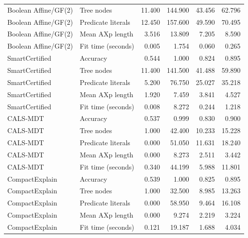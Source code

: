 \begin{longtable}{llrrrr}
Boolean Affine/GF(2) & Tree nodes & 11.400 & 144.900 & 43.456 & 62.796 \\
Boolean Affine/GF(2) & Predicate literals & 12.450 & 157.600 & 49.590 & 70.495 \\
Boolean Affine/GF(2) & Mean AXp length & 3.516 & 13.809 & 7.205 & 8.590 \\
Boolean Affine/GF(2) & Fit time (seconds) & 0.005 & 1.754 & 0.060 & 0.265 \\
SmartCertified & Accuracy & 0.544 & 1.000 & 0.824 & 0.895 \\
SmartCertified & Tree nodes & 11.400 & 141.500 & 41.488 & 59.890 \\
SmartCertified & Predicate literals & 5.200 & 76.750 & 25.027 & 35.218 \\
SmartCertified & Mean AXp length & 1.920 & 7.459 & 3.841 & 4.527 \\
SmartCertified & Fit time (seconds) & 0.008 & 8.272 & 0.244 & 1.218 \\
CALS-MDT & Accuracy & 0.537 & 0.999 & 0.830 & 0.900 \\
CALS-MDT & Tree nodes & 1.000 & 42.400 & 10.233 & 15.228 \\
CALS-MDT & Predicate literals & 0.000 & 51.050 & 11.631 & 18.240 \\
CALS-MDT & Mean AXp length & 0.000 & 8.273 & 2.511 & 3.442 \\
CALS-MDT & Fit time (seconds) & 0.340 & 44.199 & 5.988 & 11.801 \\
CompactExplain & Accuracy & 0.539 & 1.000 & 0.825 & 0.895 \\
CompactExplain & Tree nodes & 1.000 & 32.500 & 8.985 & 13.263 \\
CompactExplain & Predicate literals & 0.000 & 58.950 & 9.464 & 16.108 \\
CompactExplain & Mean AXp length & 0.000 & 9.274 & 2.219 & 3.224 \\
CompactExplain & Fit time (seconds) & 0.121 & 19.187 & 1.688 & 4.034 \\
\bottomrule
\end{longtable}
\endgroup
